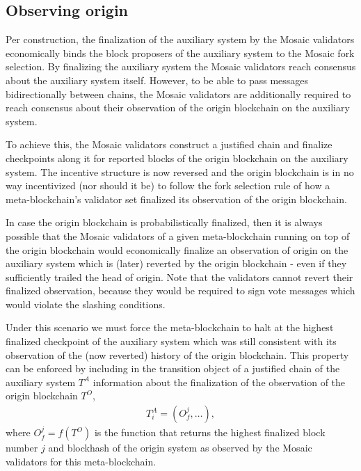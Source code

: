 \documentclass[12pt,a4paper]{article}
\begin{document}

\subsection{Observing origin}
\label{observing_origin}

Per construction, the finalization of the auxiliary system by the Mosaic validators economically binds the block proposers of the auxiliary system to the Mosaic fork selection.
By finalizing the auxiliary system the Mosaic validators reach consensus about the auxiliary system itself.
However, to be able to pass messages bidirectionally between chains, the Mosaic validators are additionally required to reach consensus about their observation of the origin blockchain on the auxiliary system.

To achieve this, the Mosaic validators construct a justified chain and finalize checkpoints along it for reported blocks of the origin blockchain on the auxiliary system.
The incentive structure is now reversed and the origin blockchain is in no way incentivized (nor should it be) to follow the fork selection rule of how a meta-blockchain's validator set finalized its observation of the origin blockchain.

In case the origin blockchain is probabilistically finalized, then it is always possible that the Mosaic validators of a given meta-blockchain running on top of the origin blockchain would economically finalize an observation of origin on the auxiliary system which is (later) reverted by the origin blockchain - even if they sufficiently trailed the head of origin.
Note that the validators cannot revert their finalized observation, because they would be required to sign vote messages which would violate the slashing conditions.

Under this scenario we must force the meta-blockchain to halt at the highest finalized checkpoint of the auxiliary system which was still consistent with its observation of the (now reverted) history of the origin blockchain.
This property can be enforced by including in the transition object of a justified chain of the auxiliary system $T^A$ information about the finalization of the observation of the origin blockchain $T^O$,
\begin{align*}
  T^A_i = (O^j_f, \dots),
\end{align*}
where $O^j_f = f(T^O)$ is the function that returns the highest finalized block number $j$ and blockhash of the origin system as observed by the Mosaic validators for this meta-blockchain.
\end{document}
